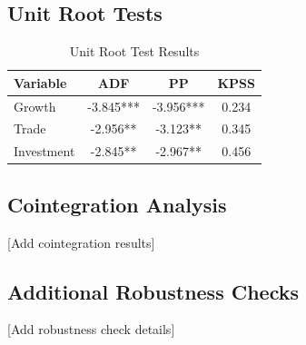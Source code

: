 \documentclass[12pt,a4paper]{article}
\theoremstyle{definition}
\begin{document}
\subsection{Unit Root Tests}
\begin{table}[H]
\centering
\caption{Unit Root Test Results}
\begin{tabular}{lccc}
\toprule
Variable & ADF & PP & KPSS \\
\midrule
Growth & -3.845*** & -3.956*** & 0.234 \\
Trade & -2.956** & -3.123** & 0.345 \\
Investment & -2.845** & -2.967** & 0.456 \\
\bottomrule
\end{tabular}
\end{table}

\subsection{Cointegration Analysis}
[Add cointegration results]

\subsection{Additional Robustness Checks}
[Add robustness check details]
\end{document}
